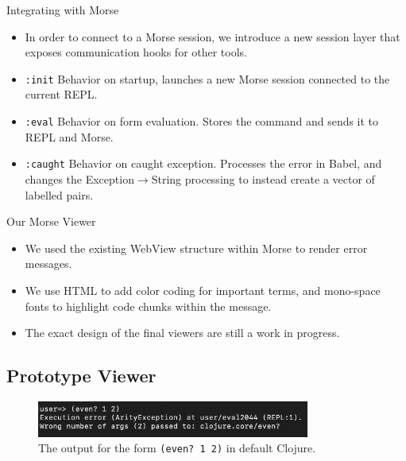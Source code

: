 \documentclass{beamer}
\begin{document}
\begin{frame}{Integrating with Morse}
  \begin{itemize}
    \item In order to connect to a Morse session, we introduce a new session layer that exposes communication hooks for other tools.
    \item \texttt{:init} Behavior on startup, launches a new Morse session connected to the current REPL.
    \item \texttt{:eval} Behavior on form evaluation. Stores the command and sends it to REPL and Morse.
    \item \texttt{:caught} Behavior on caught exception. Processes the error in Babel, and changes the Exception$\rightarrow$String processing to instead create a vector of labelled pairs.  
  \end{itemize}
\end{frame}

\begin{frame}{Our Morse Viewer}
  \begin{itemize}
  \item We used the existing WebView structure within Morse to render error messages.
  \item We use HTML to add color coding for important terms, and mono-space fonts to highlight code chunks within the message.
  \item The exact design of the final viewers are still a work in progress.
  \end{itemize}
\end{frame}

\subsection{Prototype Viewer}
\begin{frame}
  \begin{figure}
    \centering
    \includegraphics[width=0.8\textwidth]{../resources/CljDefaultEven.png}
    \caption{The output for the form \texttt{(even?~1~2)} in default Clojure. }
    \label{fig:defaultclj}
  \end{figure}
\end{frame}
\end{document}
